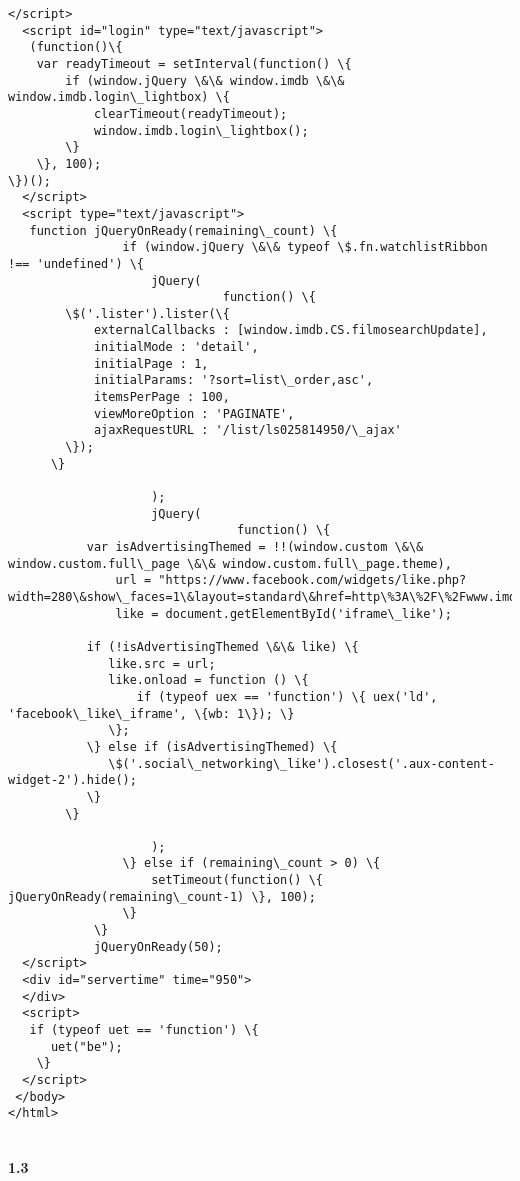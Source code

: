 \documentclass[11pt]{article}
\begin{document}
\begin{Verbatim}[commandchars=\\\{\}]
  </script>
  <script id="login" type="text/javascript">
   (function()\{
    var readyTimeout = setInterval(function() \{
        if (window.jQuery \&\& window.imdb \&\& window.imdb.login\_lightbox) \{
            clearTimeout(readyTimeout);
            window.imdb.login\_lightbox();
        \}
    \}, 100);
\})();
  </script>
  <script type="text/javascript">
   function jQueryOnReady(remaining\_count) \{
                if (window.jQuery \&\& typeof \$.fn.watchlistRibbon !== 'undefined') \{
                    jQuery(
                              function() \{
        \$('.lister').lister(\{
            externalCallbacks : [window.imdb.CS.filmosearchUpdate],
            initialMode : 'detail',
            initialPage : 1,
            initialParams: '?sort=list\_order,asc',
            itemsPerPage : 100,
            viewMoreOption : 'PAGINATE',
            ajaxRequestURL : '/list/ls025814950/\_ajax'
        \});
      \}

                    );
                    jQuery(
                                function() \{
           var isAdvertisingThemed = !!(window.custom \&\& window.custom.full\_page \&\& window.custom.full\_page.theme),
               url = "https://www.facebook.com/widgets/like.php?width=280\&show\_faces=1\&layout=standard\&href=http\%3A\%2F\%2Fwww.imdb.com\%2Flist\%2Fls025814950\%2F\&colorscheme=light",
               like = document.getElementById('iframe\_like');

           if (!isAdvertisingThemed \&\& like) \{
              like.src = url;
              like.onload = function () \{
                  if (typeof uex == 'function') \{ uex('ld', 'facebook\_like\_iframe', \{wb: 1\}); \}
              \};
           \} else if (isAdvertisingThemed) \{
              \$('.social\_networking\_like').closest('.aux-content-widget-2').hide();
           \}
        \}

                    );
                \} else if (remaining\_count > 0) \{
                    setTimeout(function() \{ jQueryOnReady(remaining\_count-1) \}, 100);
                \}
            \}
            jQueryOnReady(50);
  </script>
  <div id="servertime" time="950">
  </div>
  <script>
   if (typeof uet == 'function') \{
      uet("be");
    \}
  </script>
 </body>
</html>


    \end{Verbatim}

    \paragraph{1.3}\label{section}
\end{document}
